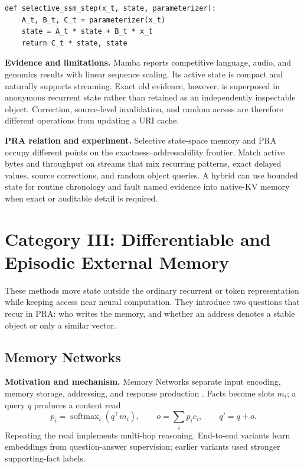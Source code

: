 \begin{lstlisting}[caption={Conceptual input-selective state update}]
def selective_ssm_step(x_t, state, parameterizer):
    A_t, B_t, C_t = parameterizer(x_t)
    state = A_t * state + B_t * x_t
    return C_t * state, state
\end{lstlisting}

\textbf{Evidence and limitations.} Mamba reports competitive language, audio, and genomics
results with linear sequence scaling. Its active state is compact and naturally supports
streaming. Exact old evidence, however, is superposed in anonymous recurrent state rather than
retained as an independently inspectable object. Correction, source-level invalidation, and
random access are therefore different operations from updating a URI cache.

\textbf{PRA relation and experiment.} Selective state-space memory and PRA occupy different
points on the exactness--addressability frontier. Match active bytes and throughput on streams
that mix recurring patterns, exact delayed values, source corrections, and random object
queries. A hybrid can use bounded state for routine chronology and fault named evidence into
native-KV memory when exact or auditable detail is required.

\section{Category III: Differentiable and Episodic External Memory}

These methods move state outside the ordinary recurrent or token representation while
keeping access near neural computation.  They introduce two questions that recur in PRA:
who writes the memory, and whether an address denotes a stable object or only a similar
vector.

\subsection{Memory Networks}

\textbf{Motivation and mechanism.} Memory Networks separate input encoding, memory
storage, addressing, and response production \citep{weston2015memory}.  Facts become slots
$m_i$; a query $q$ produces a content read
\begin{equation}
p_i=\operatorname{softmax}_i(q^\top m_i),\qquad
o=\sum_i p_i c_i,\qquad q' = q+o.
\end{equation}
Repeating the read implements multi-hop reasoning.  End-to-end variants learn embeddings
from question-answer supervision; earlier variants used stronger supporting-fact labels.

